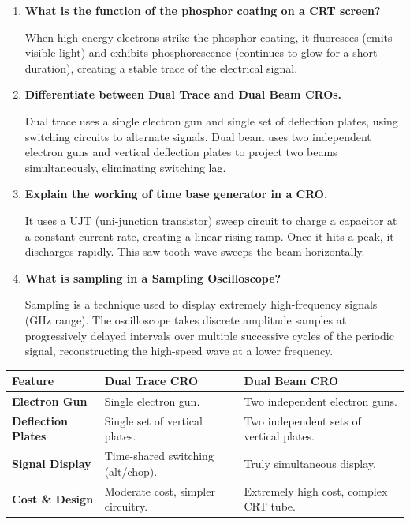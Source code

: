 \documentclass[12pt,a4paper]{article}
\newcommand{\Q}[1]{\textbf{#1}\par\noindent\ignorespaces}
\renewcommand{\arraystretch}{1.45}
\begin{document}
\begin{tcolorbox}[exambox, title={\textbf{Frequently Asked / Viva Questions}}]
\begin{enumerate}[topsep=0pt, label=\textbf{Q\arabic*.}, itemsep=5pt]
  \item \Q{What is the function of the phosphor coating on a CRT screen?}
    When high-energy electrons strike the phosphor coating, it fluoresces (emits visible light) and exhibits phosphorescence (continues to glow for a short duration), creating a stable trace of the electrical signal.
  \item \Q{Differentiate between Dual Trace and Dual Beam CROs.}
    Dual trace uses a single electron gun and single set of deflection plates, using switching circuits to alternate signals. Dual beam uses two independent electron guns and vertical deflection plates to project two beams simultaneously, eliminating switching lag.
  \item \Q{Explain the working of time base generator in a CRO.}
    It uses a UJT (uni-junction transistor) sweep circuit to charge a capacitor at a constant current rate, creating a linear rising ramp. Once it hits a peak, it discharges rapidly. This saw-tooth wave sweeps the beam horizontally.
  \item \Q{What is sampling in a Sampling Oscilloscope?}
    Sampling is a technique used to display extremely high-frequency signals (GHz range). The oscilloscope takes discrete amplitude samples at progressively delayed intervals over multiple successive cycles of the periodic signal, reconstructing the high-speed wave at a lower frequency.
\end{enumerate}
\end{tcolorbox}

\begin{tcolorbox}[tikzbox, title={Dual Trace vs Dual Beam Oscilloscope Comparison}]
\renewcommand{\arraystretch}{1.4}
\par\noindent
\begin{tabularx}{\linewidth}{|B{2.2cm}|>{\small\centering\arraybackslash}X|>{\small\centering\arraybackslash}X|}
\hline
\textbf{Feature} & \textbf{\color{myred}Dual Trace CRO} & \textbf{\color{myteal}Dual Beam CRO} \\
\hline
\textbf{Electron Gun} & Single electron gun. & Two independent electron guns. \\
\hline
\textbf{Deflection Plates} & Single set of vertical plates. & Two independent sets of vertical plates. \\
\hline
\textbf{Signal Display} & Time-shared switching (alt/chop). & Truly simultaneous display. \\
\hline
\textbf{Cost \& Design} & Moderate cost, simpler circuitry. & Extremely high cost, complex CRT tube. \\
\hline
\end{tabularx}
\end{tcolorbox}
\end{document}

